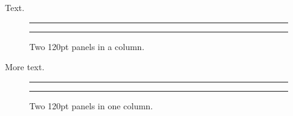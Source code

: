\documentclass[twocolumn]{article}
\begin{document}
Text.
\begin{figure}
\centering
\rule{120pt}{1cm}\hspace{4pt}\rule{120pt}{1cm}
\caption{Two 120pt panels in a column.}
\end{figure}
\onecolumn
More text.
\begin{figure}
\centering
\rule{120pt}{1cm}\hspace{4pt}\rule{120pt}{1cm}
\caption{Two 120pt panels in one column.}
\end{figure}
\end{document}
